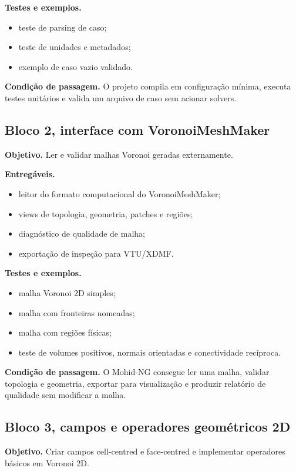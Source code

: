 \documentclass[11pt,a4paper]{article}
\begin{document}
\textbf{Testes e exemplos.}
\begin{itemize}
  \item teste de parsing de caso;
  \item teste de unidades e metadados;
  \item exemplo de caso vazio validado.
\end{itemize}

\textbf{Condi\c{c}\~ao de passagem.} O projeto compila em configura\c{c}\~ao m\'inima, executa testes unit\'arios e valida um arquivo de caso sem acionar solvers.

\subsection*{Bloco 2, interface com VoronoiMeshMaker}

\textbf{Objetivo.} Ler e validar malhas Voronoi geradas externamente.

\textbf{Entreg\'aveis.}
\begin{itemize}
  \item leitor do formato computacional do VoronoiMeshMaker;
  \item views de topologia, geometria, patches e regi\~oes;
  \item diagn\'ostico de qualidade de malha;
  \item exporta\c{c}\~ao de inspe\c{c}\~ao para VTU/XDMF.
\end{itemize}

\textbf{Testes e exemplos.}
\begin{itemize}
  \item malha Voronoi 2D simples;
  \item malha com fronteiras nomeadas;
  \item malha com regi\~oes f\'isicas;
  \item teste de volumes positivos, normais orientadas e conectividade rec\'iproca.
\end{itemize}

\textbf{Condi\c{c}\~ao de passagem.} O Mohid-NG consegue ler uma malha, validar topologia e geometria, exportar para visualiza\c{c}\~ao e produzir relat\'orio de qualidade sem modificar a malha.

\subsection*{Bloco 3, campos e operadores geom\'etricos 2D}

\textbf{Objetivo.} Criar campos cell-centred e face-centred e implementar operadores b\'asicos em Voronoi 2D.
\end{document}
